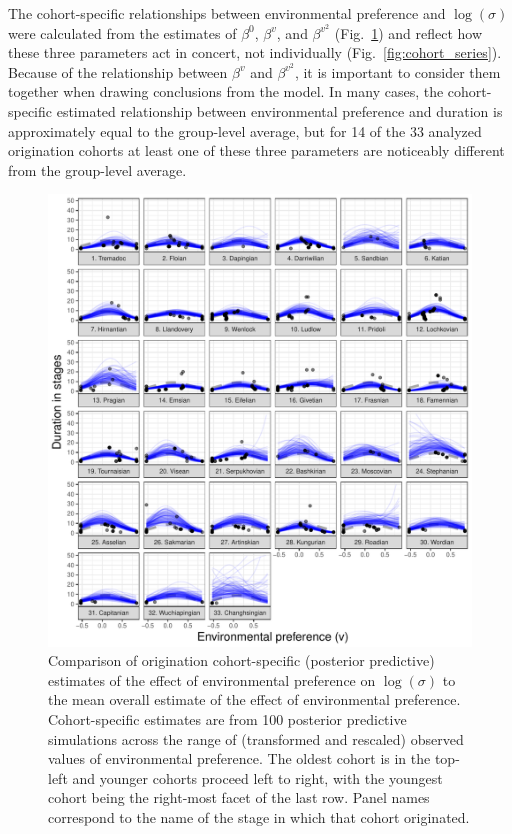 \documentclass[11pt]{article}
\begin{document}
The cohort-specific relationships between environmental preference and \(\log(\sigma)\) were calculated from the estimates of \(\beta^{0}\), \(\beta^{v}\), and \(\beta^{v^{2}}\) (Fig.~\ref{fig:env_cohort}) and reflect how these three parameters act in concert, not individually (Fig.~\ref{fig:cohort_series}). Because of the relationship between \(\beta^{v}\) and \(\beta^{v^{2}}\), it is important to consider them together when drawing conclusions from the model. In many cases, the cohort-specific estimated relationship between environmental preference and duration is approximately equal to the group-level average, but for 14 of the 33 analyzed origination cohorts at least one of these three parameters are noticeably different from the group-level average. 

\begin{figure}[ht]
  \centering
  \includegraphics[width = \textwidth,height = 0.7\textheight,keepaspectratio=true]{figure/env_cohort_med_cweib_cens}
  \caption{Comparison of origination cohort-specific (posterior predictive) estimates of the effect of environmental preference on \(\log(\sigma)\) to the mean overall estimate of the effect of environmental preference. Cohort-specific estimates are from 100 posterior predictive simulations across the range of (transformed and rescaled) observed values of environmental preference. The oldest cohort is in the top-left and younger cohorts proceed left to right, with the youngest cohort being the right-most facet of the last row. Panel names correspond to the name of the stage in which that cohort originated.}
  \label{fig:env_cohort}
\end{figure}
\clearpage
\end{document}
